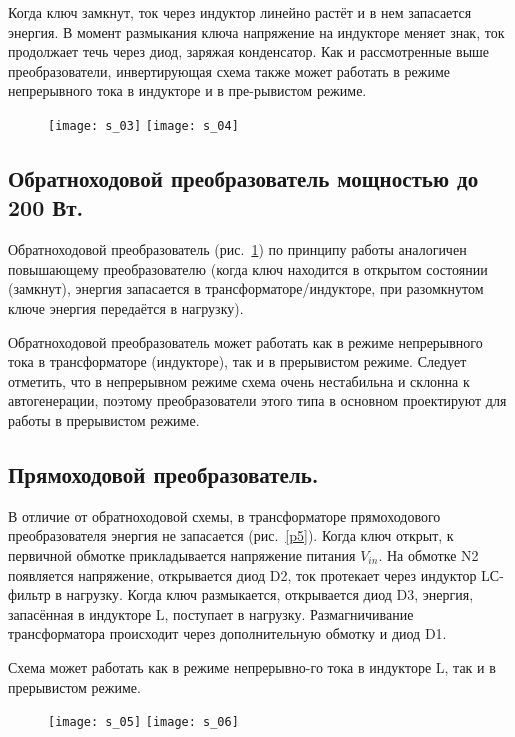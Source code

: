 	Когда ключ замкнут, ток через индуктор линейно растёт и в нем запасается энергия. В момент размыкания ключа напряжение на индукторе меняет знак, ток продолжает течь через диод, заряжая конденсатор. 
Как и рассмотренные выше преобразователи, инвертирующая схема также может работать в режиме непрерывного тока в индукторе и в пре-рывистом режиме.

\begin{figure}[ht]
	\texttt{[image: s\_03]} \hfill
	\texttt{[image: s\_04]}
	\parbox{.45\textwidth}{\caption{}\label{p3}} \hfill
	\parbox{.45\textwidth}{\caption{}\label{p4}}
\end{figure}

\subsection{Обратноходовой преобразователь мощностью до 200 Вт.}

	Обратноходовой преобразователь (рис.~\ref{p4}) по принципу работы аналогичен повышающему преобразователю (когда ключ находится в открытом состоянии (замкнут), энергия запасается в трансформаторе/индукторе, при разомкнутом ключе энергия передаётся в нагрузку).
	
	Обратноходовой преобразователь может работать как в режиме непрерывного тока в трансформаторе (индукторе), так и в прерывистом режиме. Следует отметить, что в непрерывном режиме схема очень нестабильна и склонна к автогенерации, поэтому преобразователи этого типа в основном проектируют для работы в прерывистом режиме.

\subsection{Прямоходовой преобразователь.}

	В отличие от обратноходовой схемы, в трансформаторе прямоходового преобразователя энергия не запасается (рис.~\ref{p5}). Когда ключ открыт, к первичной обмотке прикладывается напряжение питания $ V_{in} $. На обмотке N2 появляется напряжение, открывается диод D2, ток протекает через индуктор LС-фильтр в нагрузку. Когда ключ размыкается, 
открывается диод D3, энергия, запасённая в индукторе L, поступает в нагрузку. Размагничивание трансформатора происходит через дополнительную обмотку и диод D1.

	Схема может работать как в режиме непрерывно-го тока в индукторе L, так и в прерывистом режиме.

\begin{figure}[ht]
	\texttt{[image: s\_05]} \hfill
	\texttt{[image: s\_06]}
	\parbox{.45\textwidth}{\caption{}\label{p5}} \hfill
	\parbox{.45\textwidth}{\caption{}\label{p6}}
\end{figure}

